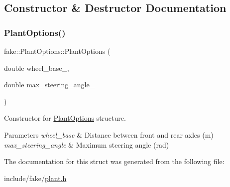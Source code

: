 \subsection{Constructor \& Destructor Documentation}
\mbox{\label{structfake_1_1_plant_options_ad3757f5f0e5624335772a3d4c42ab91c}} 
\subsubsection{\texorpdfstring{Plant\+Options()}{PlantOptions()}}
{\footnotesize\ttfamily fake\+::\+Plant\+Options\+::\+Plant\+Options (\begin{DoxyParamCaption}\item[{double}]{wheel\+\_\+base\+\_\+,  }\item[{double}]{max\+\_\+steering\+\_\+angle\+\_\+ }\end{DoxyParamCaption})\hspace{0.3cm}{\ttfamily [inline]}}



Constructor for \hyperlink{structfake_1_1_plant_options}{Plant\+Options} structure. 


\begin{DoxyParams}{Parameters}
{\em wheel\+\_\+base} & Distance between front and rear axles (m) \\
\hline
{\em max\+\_\+steering\+\_\+angle} & Maximum steering angle (rad) \\
\hline
\end{DoxyParams}


The documentation for this struct was generated from the following file\+:\begin{DoxyCompactItemize}
\item 
include/fake/\hyperlink{plant_8h}{plant.\+h}\end{DoxyCompactItemize}
